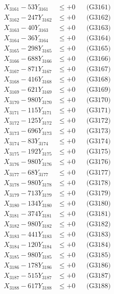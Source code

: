 \documentclass[a4paper,10pt]{article}
\begin{document}
{\begin{align}
\allowbreak
X_{3161} - 53Y_{3161} &\leq +0 && \text{(G3161)} \\
X_{3162} - 247Y_{3162} &\leq +0 && \text{(G3162)} \\
X_{3163} - 40Y_{3163} &\leq +0 && \text{(G3163)} \\
X_{3164} - 36Y_{3164} &\leq +0 && \text{(G3164)} \\
X_{3165} - 298Y_{3165} &\leq +0 && \text{(G3165)} \\
X_{3166} - 688Y_{3166} &\leq +0 && \text{(G3166)} \\
X_{3167} - 871Y_{3167} &\leq +0 && \text{(G3167)} \\
X_{3168} - 416Y_{3168} &\leq +0 && \text{(G3168)} \\
X_{3169} - 621Y_{3169} &\leq +0 && \text{(G3169)} \\
X_{3170} - 980Y_{3170} &\leq +0 && \text{(G3170)} \\
\allowbreak
X_{3171} - 115Y_{3171} &\leq +0 && \text{(G3171)} \\
X_{3172} - 125Y_{3172} &\leq +0 && \text{(G3172)} \\
X_{3173} - 696Y_{3173} &\leq +0 && \text{(G3173)} \\
X_{3174} - 83Y_{3174} &\leq +0 && \text{(G3174)} \\
X_{3175} - 192Y_{3175} &\leq +0 && \text{(G3175)} \\
X_{3176} - 980Y_{3176} &\leq +0 && \text{(G3176)} \\
X_{3177} - 68Y_{3177} &\leq +0 && \text{(G3177)} \\
X_{3178} - 980Y_{3178} &\leq +0 && \text{(G3178)} \\
X_{3179} - 713Y_{3179} &\leq +0 && \text{(G3179)} \\
X_{3180} - 134Y_{3180} &\leq +0 && \text{(G3180)} \\
\allowbreak
X_{3181} - 374Y_{3181} &\leq +0 && \text{(G3181)} \\
X_{3182} - 980Y_{3182} &\leq +0 && \text{(G3182)} \\
X_{3183} - 441Y_{3183} &\leq +0 && \text{(G3183)} \\
X_{3184} - 120Y_{3184} &\leq +0 && \text{(G3184)} \\
X_{3185} - 980Y_{3185} &\leq +0 && \text{(G3185)} \\
X_{3186} - 178Y_{3186} &\leq +0 && \text{(G3186)} \\
X_{3187} - 515Y_{3187} &\leq +0 && \text{(G3187)} \\
X_{3188} - 617Y_{3188} &\leq +0 && \text{(G3188)} \\

\end{align}}
\end{document}
